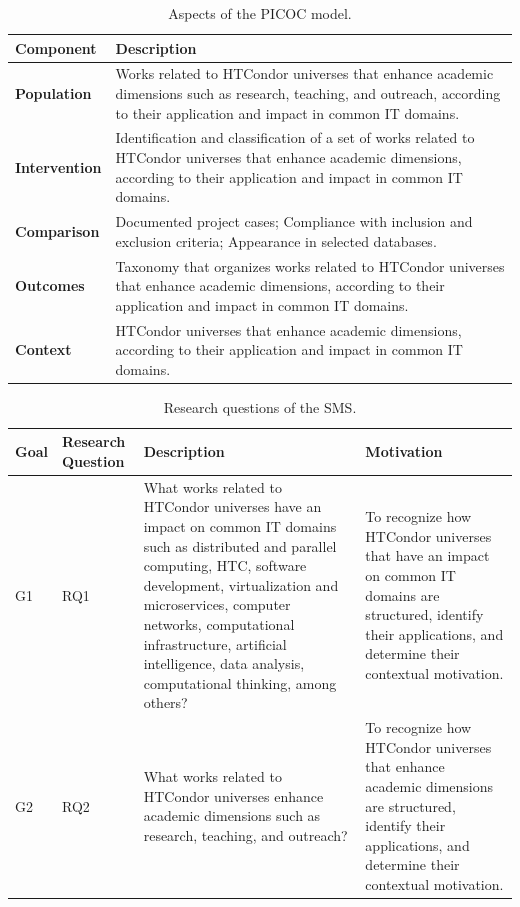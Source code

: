 \begin{table}[htbp]
	\centering
	\caption{Aspects of the PICOC model.}
	\label{table:PICOC}
	\renewcommand{\arraystretch}{1}  %
	\begin{tabular}{p{1.4cm}p{6.4cm}}
		\toprule
		\textbf{Component}   & \textbf{Description}   \\
		\midrule
		\textbf{Population}    & Works related to HTCondor universes that enhance academic dimensions such as research, teaching, and outreach, according to their application and impact in common IT domains.                                                  \\
		\addlinespace[0.8em]
		\textbf{Intervention} & Identification and classification of a set of works related to HTCondor universes that enhance academic dimensions, according to their application and impact in common IT domains.  \\
		\addlinespace[0.8em]
		\textbf{Comparison}  & Documented project cases; Compliance with inclusion and exclusion criteria; Appearance in selected databases.  \\
		\addlinespace[0.8em]
		\textbf{Outcomes}      & Taxonomy that organizes works related to HTCondor universes that enhance academic dimensions, according to their application and impact in common IT domains.                        \\
		\addlinespace[0.8em]
		\textbf{Context}     & HTCondor universes that enhance academic dimensions, according to their application and impact in common IT domains.    \\
		\bottomrule
	\end{tabular}
\end{table}

\begin{table}[htbp]
	\centering
	\caption{Research questions of the SMS.}
	\label{table:RQs}
	\renewcommand{\arraystretch}{1}  %
	\begin{tabular}{p{1cm}p{1.7cm}p{6.8cm}p{6.8cm}}
		\toprule
		\textbf{Goal} & \textbf{Research Question} & \textbf{Description} & \textbf{Motivation} \\
		\midrule
		G1 & RQ1 & What works related to HTCondor universes have an impact on common IT domains such as distributed and parallel computing, HTC, software development, virtualization and microservices, computer networks, computational infrastructure, artificial intelligence, data analysis, computational thinking, among others? & To recognize how HTCondor universes that have an impact on common IT domains are structured, identify their applications, and determine their contextual motivation. \\
		\addlinespace[0.8em]
		G2 & RQ2 & What works related to HTCondor universes enhance academic dimensions such as research, teaching, and outreach? & To recognize how HTCondor universes that enhance academic dimensions are structured, identify their applications, and determine their contextual motivation. \\
		\bottomrule
	\end{tabular}
\end{table}

